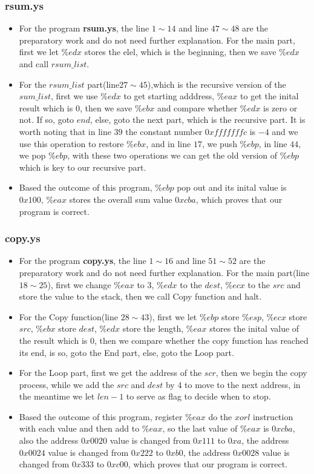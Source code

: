 \documentclass[12pt,a4paper]{article}
\theoremstyle{definition}
\numberwithin{equation}{section}
\numberwithin{figure}{section}
\begin{document}
\subsubsection{rsum.ys}
\begin{itemize}
	\item For the program \textbf{rsum.ys}, the line $1\sim 14$ and line $47\sim 48$ are the preparatory work and do not need further explanation.
	For the main part, first we let $\%edx$ stores the elel, which is the beginning, then we save $\%edx$ and call $rsum\_list$.
	\item For the $rsum\_list$ part(line$27\sim 45$),which is the recursive version of the $sum\_list$, first we use $\%edx$ to get starting adddress, $\%eax$ to get the inital result which is $0$, then we save $\%ebx$ and compare whether $\%edx$ is zero or not. If so, goto $end$, else, goto the next part, which is the recursive part. It is worth noting that in line $39$ the constant number $0xfffffffc$ is $-4$ and we use this operation to restore $\%ebx$, and in line $17$, we push $\%ebp$, in line $44$, we pop $\%ebp$, with these two operations we can get the old version of $\%ebp$ which is key to our recursive part.
	\item Based the outcome of this program, $\%ebp$ pop out and its inital value is $0x100$, $\%eax$ stores the overall sum value $0xcba$, which proves that our program is correct.
\end{itemize}

\subsubsection{copy.ys}
\begin{itemize}
	\item For the program \textbf{copy.ys}, the line $1\sim 16$ and line $51\sim 52$ are the preparatory work and do not need further explanation.
	For the main part(line $18\sim 25$), first we change $\%eax$ to $3$, $\%edx$ to the $dest$, $\%ecx$ to the $src$ and store the value to the stack, then we call Copy function and halt.
	\item For the Copy function(line $28\sim 43$), first we let $\%ebp$ store $\%esp$, $\%ecx$ store $src$, $\%ebx$ store $dest$, $\%edx$ store the length, $\%eax$ stores the inital value of the result which is $0$, then we compare whether the copy function has reached its end, is so, goto the End part, else, goto the Loop part.
	\item For the Loop part, first we get the address of the $scr$, then we begin the copy process, while we add the $src$ and $dest$ by 4 to move to the next address, in the meantime we let $len-1$ to serve as flag to decide when to stop.
	\item Based the outcome of this program, register $\%eax$ do the $xorl$ instruction with each value and then add to $\%eax$, so the last value of $\%eax$ is $0xcba$, also the address $0x0020$ value is changed from $0x111$ to $0xa$, the address $0x0024$ value is changed from $0x222$ to $0xb0$, the address $0x0028$ value is changed from $0x333$ to $0xc00$, which proves that our program is correct.
\end{itemize}
\end{document}
